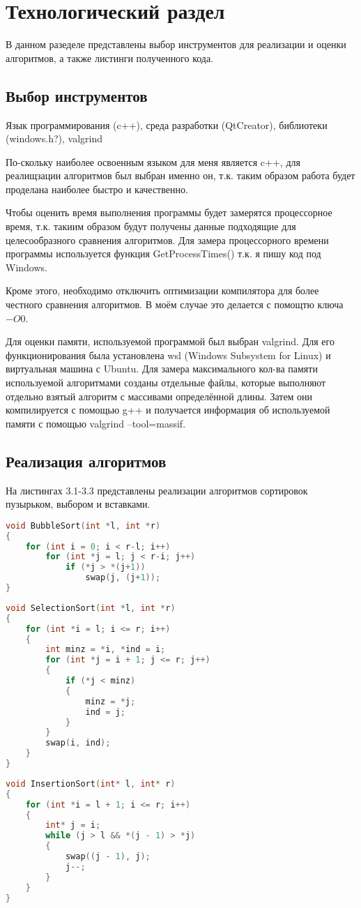 \chapter{Технологический раздел}
В данном разеделе представлены выбор инструментов для реализации и оценки алгоритмов, а также листинги полученного кода.
\section{Выбор инструментов}
Язык программирования (c++), среда разработки (QtCreator), библиотеки (windows.h?), valgrind

По-скольку наиболее освоенным языком для меня является c++, для реалищзации алгоритмов был выбран именно он, т.к. таким образом работа будет проделана наиболее быстро и качественно.

Чтобы оценить время выполнения программы будет замерятся процессорное время, т.к. такиим образом будут получены данные подходящие для целесообразного сравнения алгоритмов. Для замера процессорного времени программы используется функция GetProcessTimes() т.к. я пишу код под Windows. \cite{get_proccess_times}

Кроме этого, необходимо отключить оптимизации компилятора для более честного сравнения алгоритмов. В моём случае это делается с помощтю ключа $-O0$. 

Для оценки памяти, используемой программой был выбран valgrind. Для его функционирования была установлена wsl (Windows Subsystem for Linux) и виртуальная машина с Ubuntu. Для замера максимального кол-ва памяти используемой алгоритмами созданы отдельные файлы, которые выполняют отдельно взятый алгоритм с массивами определённой длины. Затем они компилируется с помощью g++ и получается информация об используемой памяти с помощью valgrind --tool=massif. \cite{get_memory}

\section{Реализация алгоритмов}
На листингах 3.1-3.3 представлены реализации алгоритмов сортировок пузырьком, выбором и вставками.

\begin{lstlisting}[language=c++, caption=Реализация алгоритма сортировки пузырьком]
void BubbleSort(int *l, int *r)
{
	for (int i = 0; i < r-l; i++)
		for (int *j = l; j < r-i; j++)
			if (*j > *(j+1))
				swap(j, (j+1));
}
\end{lstlisting}

\begin{lstlisting}[language=c++, caption=Реализация алгоритма сортировки выбором]
void SelectionSort(int *l, int *r)
{
	for (int *i = l; i <= r; i++)
	{
		int minz = *i, *ind = i;
		for (int *j = i + 1; j <= r; j++)
		{
			if (*j < minz)
			{
				minz = *j;
				ind = j;
			}
		}
		swap(i, ind);
	}
}
\end{lstlisting}

\begin{lstlisting}[language=c++, caption=Реализация алгоритма сортировки вставками]
void InsertionSort(int* l, int* r)
{
	for (int *i = l + 1; i <= r; i++)
	{
		int* j = i;
		while (j > l && *(j - 1) > *j)
		{
			swap((j - 1), j);
			j--;
		}
	}
}
\end{lstlisting}